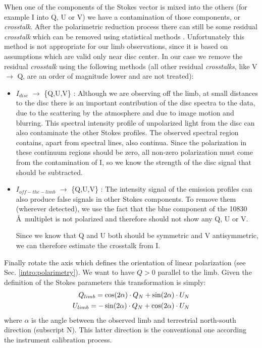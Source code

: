 When one of the components of the Stokes vector is mixed into the others (for example I into Q, U or V) we have a contamination of those components, or \emph{crosstalk}. After the polarimetric reduction process there can still be some residual \emph{crosstalk} which can be removed using statistical methods \citep{Collados:2003lr} . Unfortunately this method is not appropriate for our limb observations, since it is based on assumptions which are valid only near disc center. In our case we remove the residual \emph{crosstalk} using the following methods (all other residual \emph{crosstalks}, like V $\rightarrow$ Q, are an order of magnitude lower and are not treated):
\begin{itemize}
\item $I_{disc}$ $\rightarrow$ \{Q,U,V\} : Although we are observing off the limb, at small distances to the disc there is an important contribution of the disc spectra to the data, due to the scattering by the atmosphere and due to image motion and blurring.
This spectral intensity profile of unpolarized light from the disc can also contaminate the other Stokes profiles. The observed spectral region contains, apart from spectral lines, also continua. Since the polarization in these continuum regions should be zero, all non-zero polarization must come from the contamination of I, so we know the strength of the disc signal that should be subtracted.

\item $I_{off-the-limb}$ $\rightarrow$ \{Q,U,V\} : The intensity signal of the emission profiles can also produce false signals in other Stokes components. To remove them (wherever detected), we use the fact that the blue component of the   10830 \AA\ multiplet is not polarized and therefore should not show any Q, U or V. 

Since we know that Q and U both should be symmetric and  V antisymmetric, we can therefore estimate the crosstalk from I.

\end{itemize}

Finally rotate the axis which defines the orientation of linear polarization (see Sec. \ref{intro:polarimetry}). We want to have $Q > 0$ parallel to the limb. Given the definition of the Stokes parameters this transformation is simply:
\begin{eqnarray}
Q_{limb} = \cos(2\alpha) \cdot Q_{N} + \sin(2\alpha) \cdot U_{N} 
\cr
U_{limb} = -\sin(2\alpha) \cdot Q_{N} + \cos(2\alpha) \cdot U_{N}
\end{eqnarray}
where $\alpha$ is the angle between the observed limb and terrestrial north-south direction (subscript N). This latter direction is the conventional one according the instrument calibration process.


